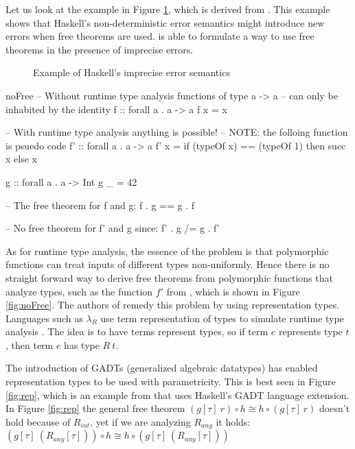 Let us look at the example in Figure \ref{fig:imprecise}, which is derived from \cite{impreciseSemantics}. This example shows that Haskell's non-deterministic error semantics might introduce new errors when free theorems are used. \cite{impreciseSemantics} is able to formulate a way to use free theorems in the presence of imprecise errors.

\begin{figure}
  \caption{Example of Haskell's imprecise error semantics}
  \label{fig:imprecise}
\end{figure}


\begin{SaveVerbatim}{noFree}
-- Without runtime type analysis functions of type a -> a
-- can only be inhabited by the identity
f :: forall a . a -> a
f x = x

-- With runtime type analysis anything is possible!
-- NOTE: the folloing function is psuedo code
f' :: forall a . a -> a
f' x = if (typeOf x) == (typeOf 1)
         then succ x
         else x

g :: forall a . a -> Int
g _ = 42

-- The free theorem for f and g:
f . g == g . f

-- No free theorem for f' and g since:
f' . g /= g . f'
\end{SaveVerbatim}


As for runtime type analysis, the essence of the problem is that polymorphic functions can treat inputs of different types non-uniformly. Hence there is no straight forward way to derive free theorems from polymorphic functions that analyze types, such as the function $f'$ from \cite{vytinFree}, which is shown in Figure \ref{fig:noFree}. The authors of \cite{vytinFree} remedy this problem by using representation types. Languages such as $\lambda_R $ use term representation of types to simulate runtime type analysis \cite{erasureSemantics}. The idea is to have terms represent types, so if term $e$ represents type $t$, then term $e$ has type $R\ t$. 

The introduction of GADTs (generalized algebraic datatypes) has enabled representation types to be used with parametricity. This is best seen in Figure \ref{fig:rep}, which is an example from \cite{vytinFree} that uses Haskell's GADT language extension. In Figure \ref{fig:rep} the general free theorem $(g[\tau]\ r) \circ h \cong h \circ (g[\tau]\ r) $ doesn't hold because of $R_{int} $, yet if we are analyzing $R_{any}$ it holds: $(g[\tau]\ (R_{any}[\tau])) \circ h \cong h \circ (g[\tau]\ (R_{any}[\tau])) $ \cite{vytinFree}

